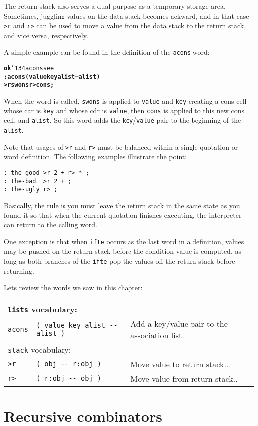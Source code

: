 \documentclass[english]{book}
\newcommand{\ttbackslash}{\char'134}
\newcommand{\wordtable}[1]{{
\begin{tabularx}{12cm}{|l l X|}
#1
\hline
\end{tabularx}}}
\newcommand{\tabvocab}[1]{
\hline
\multicolumn{3}{|l|}{
\rule[-2mm]{0mm}{6mm}
\texttt{#1} vocabulary:}
\\
\hline
}
\begin{document}
The return stack also serves a dual purpose as a temporary storage area. Sometimes, juggling values on the data stack becomes ackward, and in that case \texttt{>r} and \texttt{r>} can be used to move a value from the data stack to the return stack, and vice versa, respectively.

A simple example can be found in the definition of the \texttt{acons} word:

\begin{alltt}
\textbf{ok} \ttbackslash acons see
\textbf{: acons ( value key alist -- alist )
    >r swons r> cons ;}
\end{alltt}

When the word is called, \texttt{swons} is applied to \texttt{value} and \texttt{key} creating a cons cell whose car is \texttt{key} and whose cdr is \texttt{value}, then \texttt{cons} is applied to this new cons cell, and \texttt{alist}. So this word adds the \texttt{key}/\texttt{value} pair to the beginning of the \texttt{alist}.

Note that usages of \texttt{>r} and \texttt{r>} must be balanced within a single quotation or word definition. The following examples illustrate the point:

\begin{verbatim}
: the-good >r 2 + r> * ;
: the-bad  >r 2 + ;
: the-ugly r> ;
\end{verbatim}

Basically, the rule is you must leave the return stack in the same state as you found it so that when the current quotation finishes executing, the interpreter can return to the calling word.

One exception is that when \texttt{ifte} occurs as the last word in a definition, values may be pushed on the return stack before the condition value is computed, as long as both branches of the \texttt{ifte} pop the values off the return stack before returning.

Lets review the words we saw in this chapter:

\wordtable{
\tabvocab{lists}
\texttt{acons}&
\texttt{( value key alist -{}- alist )}&
Add a key/value pair to the association list.\\
\tabvocab{stack}
\texttt{>r}&
\texttt{( obj -{}- r:obj )}&
Move value to return stack..\\
\texttt{r>}&
\texttt{( r:obj -{}- obj )}&
Move value from return stack..\\
}

\section{Recursive combinators}
\end{document}
